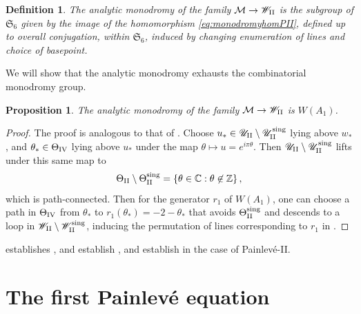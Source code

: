 \documentclass[a4paper,reqno]{amsart}
\numberwithin{equation}{section}
\newcommand{\Z}{\mathbb{Z}}
\newcommand{\C}{\mathbb{C}}
\newtheorem{definition}[theorem]{Definition}
\newtheorem{proposition}[theorem]{Proposition}
\numberwithin{equation}{section}
\begin{document}
\begin{definition}
    The \emph{analytic monodromy} of the family $\mathcal{M}\to\mathscr{W}_{\rm{II}}$ is the subgroup of $\mathfrak{S}_{6}$ given by the image of the homomorphism \eqref{eq:monodromyhomPII}, defined up to overall conjugation, within $\mathfrak{S}_{6}$, induced by changing enumeration of lines and choice of basepoint.
\end{definition}

We will show that the analytic monodromy exhausts the combinatorial monodromy group.

\begin{proposition} \label{prop:analyticmonodromyPII}
    The analytic monodromy of the family $\mathcal{M}\to\mathscr{W}_{\rm{II}}$ is $W(A_1)$.
\end{proposition}
\begin{proof}
    The proof is analogous to that of . 
    Choose $u_*\in\mathscr{U}_{\rm{II}}\setminus \mathscr{U}_{\rm{II}}^{\operatorname{sing}}$ lying above $w_*$, and $\theta_*\in\Theta_{\rm{IV}}$ lying above $u_*$ under the map $\theta\mapsto u=e^{i \pi \theta}$.
    Then $\mathscr{U}_{\rm{II}}\setminus\mathscr{U}_{\rm{II}}^{\operatorname{sing}}$ lifts under this same map to
    $$\Theta_{\rm{II}}\setminus \Theta_{\rm{II}}^{\operatorname{sing}} = \left\{ \theta \in \C: \theta \not\in  \Z
    \right\},$$
    which is path-connected.
    Then for the generator $r_1$ of $W(A_1)$, one can choose a path in $\Theta_{\rm{IV}}$ from $\theta_*$ to $r_1(\theta_*)=-2 -\theta_*$ that avoids $\Theta_{\rm{II}}^{\operatorname{sing}}$ and descends to a loop in $\mathscr{W}_{\rm{II}}\setminus \mathscr{W}_{\rm{II}}^{\operatorname{sing}}$, inducing the permutation of lines corresponding to $r_1$ in .
\end{proof}


  establishes ,    and  establish ,
and  establish  in the case of Painlev\'e-II.

\section{The first Painlev\'e equation}\label{sec:PI}
\end{document}
